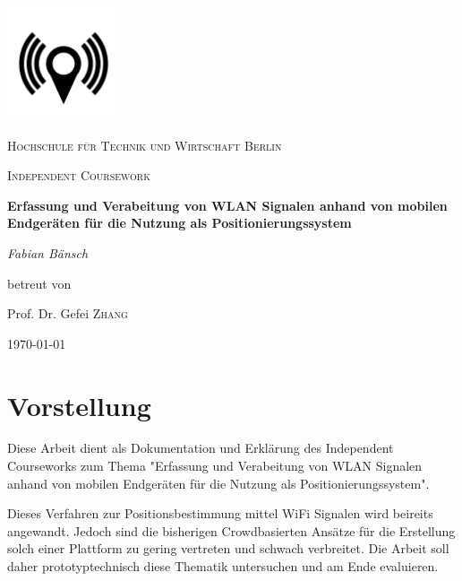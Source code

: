 \documentclass[11pt,a4paper]{article}
\begin{document}
 


\begin{titlepage}
	\centering
	\includegraphics[width=0.25\textwidth]{pics/airsniffer.png}\par\vspace{1cm}
	{\scshape\LARGE Hochschule für Technik und Wirtschaft Berlin \par}
	\vspace{1cm}
	{\scshape\Large Independent Coursework\par}
	\vspace{1.5cm}
	{\huge\bfseries Erfassung und Verabeitung von WLAN Signalen anhand von mobilen Endgeräten für die Nutzung als Positionierungssystem\par}
	\vspace{2cm}
	{\Large\itshape Fabian Bänsch\par}
	\vfill
	betreut von\par
	Prof. Dr. Gefei \textsc{Zhang}

	\vfill

	{\large \today\par}
\end{titlepage}

\tableofcontents{}

\newpage


\section{Vorstellung}

Diese Arbeit dient als Dokumentation und Erklärung des Independent Courseworks zum Thema "Erfassung und Verabeitung von WLAN Signalen anhand von mobilen Endgeräten für die Nutzung als Positionierungssystem".

Dieses Verfahren zur Positionsbestimmung mittel WiFi Signalen wird beireits angewandt. Jedoch sind die bisherigen Crowdbasierten Ansätze für die Erstellung solch einer Plattform zu gering vertreten und schwach verbreitet. Die Arbeit soll daher prototyptechnisch diese Thematik untersuchen und am Ende evaluieren.
\end{document}
